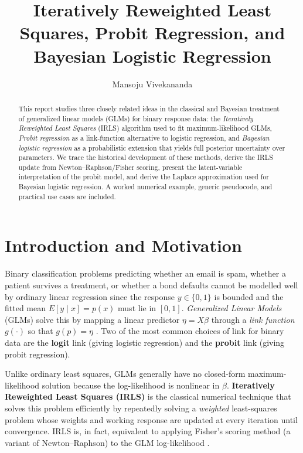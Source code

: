 \documentclass[a4paper,11pt]{article}
\title{\vspace{-1.5cm}\textbf{Iteratively Reweighted Least Squares, Probit Regression, and Bayesian Logistic Regression}}
\author{Mansoju Vivekananda}
\begin{document}
\maketitle
\vspace{-1cm}

\begin{abstract}
\noindent This report studies three closely related ideas in the classical and Bayesian treatment of generalized linear models (GLMs) for binary response data: the \emph{Iteratively Reweighted Least Squares} (IRLS) algorithm used to fit maximum-likelihood GLMs, \emph{Probit regression} as a link-function alternative to logistic regression, and \emph{Bayesian logistic regression} as a probabilistic extension that yields full posterior uncertainty over parameters. We trace the historical development of these methods, derive the IRLS update from Newton--Raphson/Fisher scoring, present the latent-variable interpretation of the probit model, and derive the Laplace approximation used for Bayesian logistic regression. A worked numerical example, generic pseudocode, and practical use cases are included.
\end{abstract}

\tableofcontents
\vspace{0.3cm}

\section{Introduction and Motivation}
Binary classification problems  predicting whether an email is spam, whether a patient survives a treatment, or whether a bond defaults cannot be modelled well by ordinary linear regression since the response $y \in \{0,1\}$ is bounded and the fitted mean $E[y\mid x]=p(x)$ must lie in $[0,1]$. \emph{Generalized Linear Models} (GLMs) solve this by mapping a linear predictor $\eta = X\beta$ through a \emph{link function} $g(\cdot)$ so that $g(p) = \eta$ \citep{nelder1972glm}. Two of the most common choices of link for binary data are the \textbf{logit} link (giving logistic regression) and the \textbf{probit} link (giving probit regression).

Unlike ordinary least squares, GLMs generally have no closed-form maximum-likelihood solution because the log-likelihood is nonlinear in $\beta$. \textbf{Iteratively Reweighted Least Squares (IRLS)} is the classical numerical technique that solves this problem efficiently by repeatedly solving a \emph{weighted} least-squares problem whose weights and working response are updated at every iteration until convergence. IRLS is, in fact, equivalent to applying Fisher's scoring method (a variant of Newton--Raphson) to the GLM log-likelihood \citep{green1984irls}.
\end{document}
